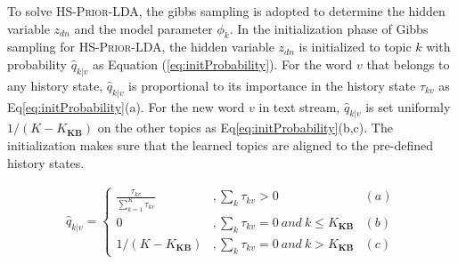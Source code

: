 \documentclass[runningheads,a4paper]{llncs}
\begin{document}

To solve \textsc{HS-Prior-LDA}, the gibbs sampling is adopted to determine the hidden variable \(z_{dn}\) and the model parameter \(\phi_k\).
In the initialization phase of Gibbs sampling for \textsc{HS-Prior-LDA}, the hidden variable \(z_{dn}\) is initialized to topic \(k\) with probability \(\hat{q}_{k|v}\) as Equation (\ref{eq:initProbability}).
For the word \(v\) that belongs to any history state, \(\hat{q}_{k|v}\) is proportional to its importance in the history state \(\tau_{kv}\) as Eq\ref{eq:initProbability}(a). 
For the new word \(v\) in text stream, \(\hat{q}_{k|v}\) is   set uniformly \(1/(K-K_{\bm{KB}})\) on the other topics as Eq\ref{eq:initProbability}(b,c). 
The initialization makes sure that the learned topics are aligned to the pre-defined history states.
\begin{scriptsize} 
\begin{equation}
\label{eq:initProbability}
\begin{aligned}
\hat{q}_{k|v}=
\left\{ \begin{aligned}
\frac{\tau_{kv}}{\sum_{k=1}^{K}\tau_{kv}} &,\sum_{k}\tau_{kv}>0 & (a)\\
0&, \sum_{k}\tau_{kv}=0 \ and \ k \leq K_{\bm{KB}} & (b)\\
1/(K-K_{\bm{KB}})&,\sum_{k}\tau_{kv}=0 \ and \ k > K_{\bm{KB}} & (c)
\end{aligned}\right.
\end{aligned}
\end{equation}
\end{scriptsize}
\end{document}
